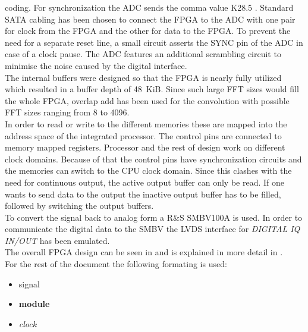 \documentclass[11pt,technote,a4paper,onecolumn,dvips]{IEEEtran}
\newcommand{\signal}[1]{{\ttfamily #1}}
\newcommand{\module}[1]{{\ttfamily\bfseries #1}}
\newcommand{\clk}[1]{{\itshape\ttfamily #1}}
\begin{document}
coding. For synchronization the ADC sends the comma value K28.5
\cite{ltc2274}. Standard
SATA cabling has been chosen to connect the FPGA to the ADC with one pair
for clock from the FPGA and the other for data to the FPGA. To prevent the
need for a separate reset line, a small circuit asserts the SYNC pin of the
ADC in case of a clock pause. The ADC features an additional scrambling
circuit to minimise the noise caused by the digital interface.\\
The internal buffers were designed so that the FPGA is nearly fully utilized
which resulted in a buffer depth of \SI{48}{KiB}. Since such large FFT sizes
would fill the whole FPGA, overlap add has been used for the convolution with
possible FFT sizes ranging from 8 to 4096.\\
In order to read or write to the different memories these are mapped into the
address space of the integrated processor. The control pins are connected to
memory mapped registers. Processor and the rest of design work on different
clock domains. Because of that the control pins have synchronization circuits
and the memories can switch to the CPU clock domain. Since this clashes with
the need for continuous output, the active output buffer can only be read. If
one wants to send data to the output the inactive output buffer has to be
filled, followed by switching the output buffers.\\
To convert the signal back to analog form a R\&S SMBV100A is used. In order to
communicate the digital data to the SMBV the LVDS interface for
\emph{DIGITAL IQ IN/OUT} has been emulated.\\
The overall FPGA design can be seen in  and is 
explained in more detail in .\\
For the rest of the document the following formating is used:
\begin{itemize}
    \item \signal{signal}
    \item \module{module}
    \item \clk{clock}
\end{itemize}
\end{document}
